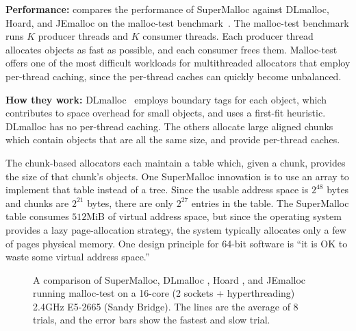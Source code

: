\documentclass[pldi]{sigplanconf-pldi15}
\begin{document}
{\bf Performance:}  compares the performance of
SuperMalloc against DLmalloc, Hoard, and JEmalloc on the malloc-test
benchmark~\cite{LeverBo00}.  The malloc-test benchmark runs $K$
producer threads and $K$ consumer threads.  Each producer thread
allocates objects as fast as possible, and each consumer frees them.
Malloc-test offers one of the most difficult workloads for
multithreaded allocators that employ per-thread caching, since the
per-thread caches can quickly become unbalanced.


{\bf How they work:} DLmalloc~\cite{Lea96} employs boundary tags for
each object, which contributes to space overhead for small objects,
and uses a first-fit heuristic.  DLmalloc has no per-thread caching.
The others allocate large aligned chunks which contain objects that
are all the same size, and provide per-thread caches.

The chunk-based allocators each maintain a table which, given a chunk,
provides the size of that chunk's objects.  One SuperMalloc innovation
is to use an array to implement that table instead of a tree. Since
the usable address space is $2^{48}$ bytes and chunks are $2^{21}$
bytes, there are only $2^{27}$ entries in the table.  The SuperMalloc
table consumes $512$MiB of virtual address space, but since the
operating system provides a lazy page-allocation strategy, the system
typically allocates only a few of pages physical memory.  One design
principle for 64-bit software is ``it is OK to waste some virtual
address space.''

\begin{figure}

\caption{A comparison of SuperMalloc, DLmalloc \cite{Lea96}, Hoard
  \cite{BergerMcBl00}, and JEmalloc~\cite{Evans06} running malloc-test
  on a 16-core (2 sockets + hyperthreading) 2.4GHz E5-2665 (Sandy
  Bridge).  The lines are the average of 8 trials, and the error bars
  show the fastest and slow trial.}
\label{fig:data}
\vspace*{-3ex}
\end{figure}

\end{document}
